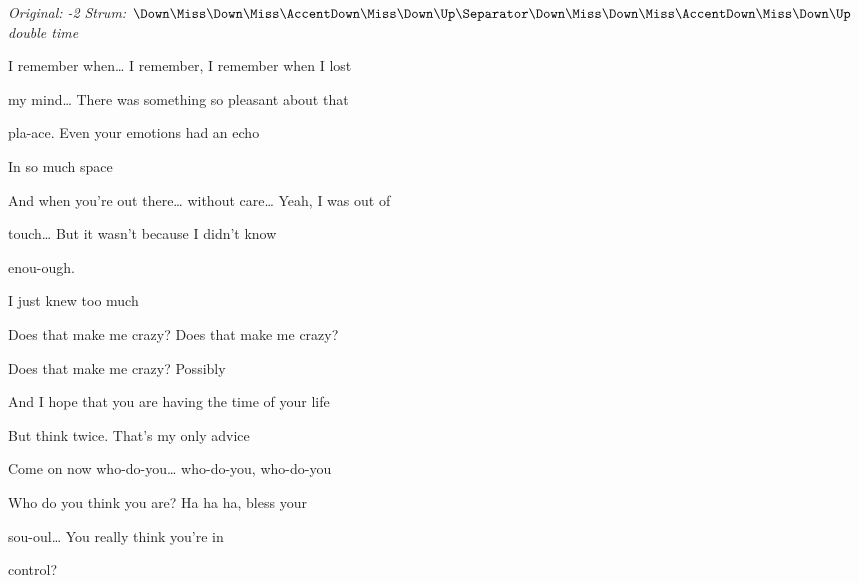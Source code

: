 \begin{song}


\begin{headerbox}
\RaiseBoxWithAccents
\textit{Original: -2} \quad
\textit{Strum:} $\Down\Miss\Down\Miss\AccentDown\Miss\Down\Up \Separator \Down\Miss\Down\Miss\AccentDown\Miss\Down\Up$ \textit{double time}
\end{headerbox}


\begin{hchordbox}
\end{hchordbox}

\Large

\bigskip

 I remember when… I remember, I remember when I lost \par
my mind… There was something so pleasant about that \par
pla-ace. Even your emotions had an echo \par
In so much space  \par

\bigskip

 And when you're out there… without care… Yeah, I was out of \par
{}touch… But it wasn't because I didn't know \par
enou-ough.  \par
I just knew too much  \par

\bigskip

Does that make me crazy? Does that make me crazy? \par
Does that make me crazy? Possibly  \par

\bigskip

 And I hope that you are having the time of your life  \par
But think twice.  That's my only advice  \par

\bigskip

 Come on now who-do-you… who-do-you, who-do-you \par
Who do you think you are? Ha ha ha, bless your \par
sou-oul…  You really think you're in \par
control?  \par


\end{song}

